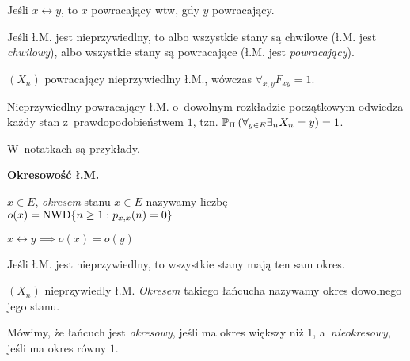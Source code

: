 



	\begin{corollary}
		Jeśli $x \leftrightarrow y$, to $x$ powracający 
		wtw, gdy $y$ powracający.
	\end{corollary}
	
	\begin{definition}
		Jeśli ł.M. jest nieprzywiedlny, to 
		albo wszystkie stany są chwilowe (ł.M. jest \emph{chwilowy}),
		albo wszystkie stany są powracające (ł.M. jest \emph{powracający}).
	\end{definition}
	
	\begin{fact}
		$(X_n)$ powracający nieprzywiedlny ł.M., 
		wówczas $\forall_{x,y} F_{xy} = 1$.
	\end{fact}
	
	\begin{corollary}
		Nieprzywiedlny powracający ł.M. 
		o~dowolnym rozkładzie początkowym 
		odwiedza każdy stan z~prawdopodobieństwem $1$,
		tzn. 
		$\P_\Pi\left( \forall_{y \in E} \exists_n X_n = y\right) = 1$.
	\end{corollary}
	
	\begin{example}
		W~notatkach są przykłady.
	\end{example}
	
	{\bf Okresowość ł.M.}
	
	\begin{definition}[okres]
		$x \in E$, \emph{okresem} stanu $x \in E$ nazywamy liczbę \\ 
		$o(x) = \mr{NWD} \{ n \geq 1: p_{x,x} (n) = 0 \}$
	\end{definition}
	
	\begin{fact}
		$x \leftrightarrow y \implies o(x) = o(y)$
	\end{fact}
	
	\begin{corollary}
		Jeśli ł.M. jest nieprzywiedlny, to wszystkie stany mają ten 
		sam okres.
	\end{corollary}
	
	\begin{definition}[okres]
		$(X_n)$ nieprzywiedly ł.M. \emph{Okresem} takiego łańcucha
		nazywamy okres dowolnego jego stanu.
		
		Mówimy, że łańcuch jest \emph{okresowy}, jeśli ma
		okres większy niż $1$, a~\emph{nieokresowy}, jeśli ma
		okres równy $1$.
	\end{definition}
	
